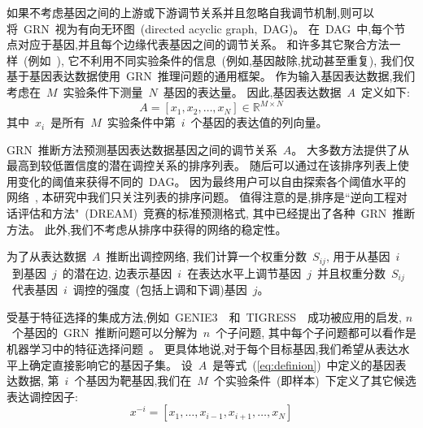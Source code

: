 如果不考虑基因之间的上游或下游调节关系并且忽略自我调节机制,则可以将~GRN~视为有向无环图~(directed acyclic graph,~DAG)。
在~DAG~中,每个节点对应于基因,并且每个边缘代表基因之间的调节关系。
和许多其它聚合方法一样~(例如~\cite{huynh2010inferring,Haury2012,slawek2013ennet,ruyssinck2014nimefi,guo2016gene,zheng2019ensemble}),
它不利用不同实验条件的信息~(例如,基因敲除,扰动甚至重复),
我们仅基于基因表达数据使用~GRN~推理问题的通用框架。
作为输入基因表达数据,我们考虑在~$M$~实验条件下测量~$N$~基因的表达量。
因此,基因表达数据~$A$~定义如下:
\begin{equation}
\label{eq:definion}
A = [x_1,x_2,\ldots,x_N] \in \mathbb{R} ^ {M \times N}
\end{equation}
其中~$x_i$~是所有~$M$~实验条件中第~$i$~个基因的表达值的列向量。

GRN~推断方法预测基因表达数据基因之间的调节关系~$A$。
大多数方法提供了从最高到较低置信度的潜在调控关系的排序列表。
随后可以通过在该排序列表上使用变化的阈值来获得不同的~DAG。
因为最终用户可以自由探索各个阈值水平的网络~\cite{slawek2013ennet},
本研究中我们只关注列表的排序问题。
值得注意的是,排序是``逆向工程对话评估和方法"~(DREAM)~\cite{stolovitzky2007dialogue}竞赛的标准预测格式,
其中已经提出了各种~GRN~推断方法。
此外,我们不考虑从排序中获得的网络的稳定性。

为了从表达数据~$A$~推断出调控网络,
我们计算一个权重分数~$S_{ij}$,
用于从基因~$i$~到基因~$j$~的潜在边,
边表示基因~$i$~在表达水平上调节基因~$j$~并且权重分数~$S_{ij}$~代表基因~$i$~调控的强度~(包括上调和下调)基因~$j$。


受基于特征选择的集成方法,例如~GENIE3~\cite{huynh2010inferring}~和~TIGRESS~\cite{Haury2012}~成功被应用的启发,
$n$~个基因的~GRN~推断问题可以分解为~$n$~个子问题,
其中每个子问题都可以看作是机器学习中的特征选择问题~\cite{nasrabadi2007pattern}。
更具体地说,对于每个目标基因,我们希望从表达水平上确定直接影响它的基因子集。
设~$A$~是等式~(\ref{eq:definion})~中定义的基因表达数据,
第~$i$~个基因为靶基因,我们在~$M$~个实验条件~(即样本)~下定义了其它候选表达调控因子:
\begin{equation}
  \label{eq:x}
  x^{-i} = [x_1,\ldots,x_{i-1},x_{i+1},\ldots,x_N]
  \end{equation}

